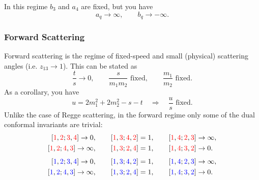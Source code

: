 In this regime $b_{3}$ and $a_{4}$ are fixed, but you have
\begin{equation}
	a_{q} \rightarrow \infty, \qquad b_{q} \rightarrow -\infty.
\end{equation}
\subsubsection{Forward Scattering}
Forward scattering is the regime of fixed-speed and small (physical) scattering angles (i.e. $z_{13} \rightarrow 1$). This can be stated as
\begin{equation}
	\frac{t}{s} \rightarrow 0, \qquad \frac{s}{m_{1} m_{2}} \text{ fixed}, \qquad \frac{m_{1}}{m_{2}} \text{ fixed}.
\end{equation}
As a corollary, you have
\begin{equation}
	u = 2m_{1}^{2} + 2m_{2}^{2} - s - t \quad \Longrightarrow \quad \frac{u}{s} \text{ fixed}.
\end{equation}
Unlike the case of Regge scattering, in the forward regime only some of the dual conformal invariants are trivial:
\begin{equation}
\begin{split}
	\left[ {\color{red} 1} , {\color{red} 2} ; {\color{red} 3} , {\color{red} 4} \right] \rightarrow 0, \qquad
	\left[ {\color{red} 1} , {\color{red} 3} ; {\color{red} 4} , {\color{red} 2} \right] &= 1, \qquad
	\left[ {\color{red} 1} , {\color{red} 4} ; {\color{red} 2} , {\color{red} 3} \right] \rightarrow \infty, \\
	\left[ {\color{red} 1} , {\color{red} 2} ; {\color{red} 4} , {\color{red} 3} \right] \rightarrow \infty, \qquad
	\left[ {\color{red} 1} , {\color{red} 3} ; {\color{red} 2} , {\color{red} 4} \right] &= 1, \qquad
	\left[ {\color{red} 1} , {\color{red} 4} ; {\color{red} 3} , {\color{red} 2} \right] \rightarrow 0.
\end{split}
\end{equation}
\begin{equation}
\begin{split}
	\left[ {\color{blue} 1} , {\color{blue} 2} ; {\color{blue} 3} , {\color{blue} 4} \right] \rightarrow 0, \qquad
	\left[ {\color{blue} 1} , {\color{blue} 3} ; {\color{blue} 4} , {\color{blue} 2} \right] &= 1, \qquad
	\left[ {\color{blue} 1} , {\color{blue} 4} ; {\color{blue} 2} , {\color{blue} 3} \right] \rightarrow \infty, \\
	\left[ {\color{blue} 1} , {\color{blue} 2} ; {\color{blue} 4} , {\color{blue} 3} \right] \rightarrow \infty, \qquad
	\left[ {\color{blue} 1} , {\color{blue} 3} ; {\color{blue} 2} , {\color{blue} 4} \right] &= 1, \qquad
	\left[ {\color{blue} 1} , {\color{blue} 4} ; {\color{blue} 3} , {\color{blue} 2} \right] \rightarrow 0.
\end{split}
\end{equation}
